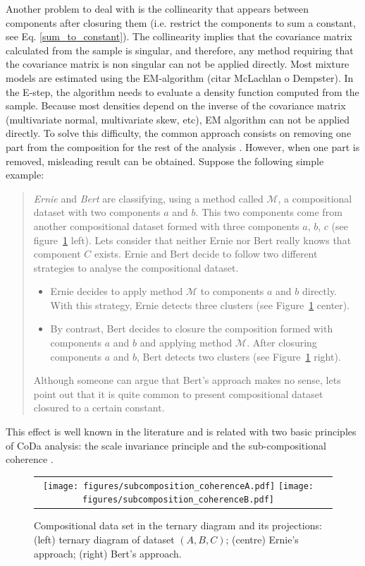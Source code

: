 \documentclass[preprint, review, 3p, authoryear]{elsarticle}
\begin{document}
Another problem to deal with is the collinearity that appears between components  after closuring them (i.e. restrict the components to sum a constant, see Eq. \ref{sum_to_constant}). The collinearity implies that the covariance matrix calculated from the sample is singular, and therefore, any method requiring that the covariance matrix is non singular can not be applied directly. Most mixture models are estimated using the EM-algorithm (citar McLachlan o Dempster). In the E-step, the algorithm needs to evaluate a density function computed from the sample. Because most densities depend on the inverse of the covariance matrix (multivariate normal, multivariate skew, etc), EM algorithm can not be applied directly. To solve this difficulty, the common approach consists on removing one part from the composition for the rest of the analysis \citep{papageorgiou2001model}. However, when one part is removed,  misleading result can be obtained. Suppose the following simple example: 
\begin{quote}
\emph{Ernie} and \emph{Bert} are classifying, using a method called $\mathcal{M}$, a compositional dataset with two components $a$ and $b$. This two components come from another compositional dataset formed with three components $a$, $b$, $c$ (see figure~\ref{fig02} left). Lets consider that neither Ernie nor Bert really knows that component $C$ exists. Ernie and Bert decide to follow two different strategies to analyse the compositional dataset.
\begin{itemize}
\item Ernie decides to apply method $\mathcal{M}$ to components $a$ and $b$ directly. With this strategy, Ernie detects three clusters (see Figure~\ref{fig02} center).
\item By contrast, Bert decides to closure the composition formed with components $a$ and $b$ and applying method $\mathcal{M}$.  After closuring components $a$ and $b$, Bert detects two clusters (see Figure~\ref{fig02} right). 
\end{itemize}
Although someone can argue that Bert's approach makes no sense, lets point out that it is quite common to present compositional dataset closured to a certain constant.
\end{quote}

This effect is well known in the literature and is related with two basic principles of
CoDa analysis: the scale invariance principle and the sub-compositional coherence \citep{aitchison1986statistical}.

\begin{figure}[htbp]
\begin{center}
\begin{tabular}{cc}
  \texttt{[image: figures/subcomposition\_coherenceA.pdf]} \texttt{[image: figures/subcomposition\_coherenceB.pdf]}  \\
 \end{tabular}
 \caption{Compositional data set in the ternary diagram and its projections: (left) ternary diagram of dataset $(A,B,C)$; (centre) Ernie's approach; (right) Bert's approach.}\label{fig02}
\end{center}
\end{figure}
\end{document}
